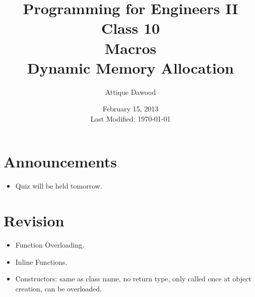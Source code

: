 \documentclass[12pt,a4paper]{article}
\title{\vspace{-2cm}Programming for Engineers II\\Class 10\\Macros\\Dynamic Memory Allocation}
\author{Attique Dawood}
\date{February 15, 2013\\[0.2cm] Last Modified: \today}
\begin{document}
\maketitle
\section{Announcements}
\begin{itemize}
\item Quiz will be held tomorrow.
\end{itemize}
\section{Revision}
\begin{itemize}
\item Function Overloading.
\item Inline Functions.
\item Constructors: same as class name, no return type, only called once at object creation, can be overloaded.
\end{itemize}
\end{document}
